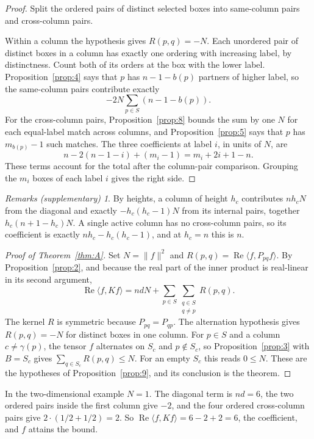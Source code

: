 \documentclass[11pt]{amsart}
\newcommand{\notlean}{supplementary}
\theoremstyle{definition}
\theoremstyle{remark}
\newtheorem*{remarks}{Remarks \textup{(\notlean)}}
\begin{document}
\begin{proof}
Split the ordered pairs of distinct selected boxes into same-column pairs
and cross-column pairs.

Within a column the hypothesis gives \(R(p,q)=-N\). Each unordered pair of
distinct boxes in a column has exactly one ordering with increasing label,
by distinctness. Count both of its orders at the box with the lower label.
Proposition~\ref{prop:4} says that \(p\) has \(n-1-b(p)\) partners of higher
label, so the same-column pairs contribute exactly
\[
-2N\sum_{p\in S}(n-1-b(p)).
\]
For the cross-column pairs, Proposition~\ref{prop:8} bounds the sum by one
\(N\) for each equal-label match across columns, and
Proposition~\ref{prop:5} says that \(p\) has \(m_{b(p)}-1\) such matches.
The three coefficients at label \(i\), in units of \(N\), are
\[
n-2(n-1-i)+(m_i-1)=m_i+2i+1-n.
\]
These terms account for the total after the column-pair comparison.
Grouping the \(m_i\) boxes of each label \(i\) gives the right side.
\end{proof}

\begin{remarks}
By heights, a column of height \(h_c\) contributes \(nh_cN\) from the
diagonal and exactly \(-h_c(h_c-1)N\) from its internal pairs, together
\(h_c(n+1-h_c)N\). A single active column has no cross-column pairs, so its
coefficient is exactly \(nh_c-h_c(h_c-1)\), and at \(h_c=n\) this is \(n\).
\end{remarks}

\begin{proof}[Proof of Theorem~\ref{thm:A}]
Set \(N=\|f\|^2\) and \(R(p,q)=\operatorname{Re}\langle f,P_{pq}f\rangle\).
By Proposition~\ref{prop:2}, and because the real part of the inner product
is real-linear in its second argument,
\[
\operatorname{Re}\langle f,Kf\rangle
=ndN+\sum_{p\in S}\sum_{\substack{q\in S\\q\ne p}}R(p,q).
\]
The kernel \(R\) is symmetric because \(P_{pq}=P_{qp}\). The alternation
hypothesis gives \(R(p,q)=-N\) for distinct boxes in one column. For
\(p\in S\) and a column \(c\ne\gamma(p)\), the tensor \(f\) alternates on
\(S_c\) and \(p\notin S_c\), so Proposition~\ref{prop:3} with \(B=S_c\) gives
\(\sum_{q\in S_c}R(p,q)\le N\). For an empty \(S_c\) this reads \(0\le N\).
These are the hypotheses of Proposition~\ref{prop:9}, and its conclusion is
the theorem.
\end{proof}

In the two-dimensional example \(N=1\). The diagonal term is \(nd=6\), the two
ordered pairs inside the first column give \(-2\), and the four ordered
cross-column pairs give \(2\cdot(1/2+1/2)=2\). So
\(\operatorname{Re}\langle f,Kf\rangle=6-2+2=6\), the coefficient, and \(f\)
attains the bound.
\end{document}
